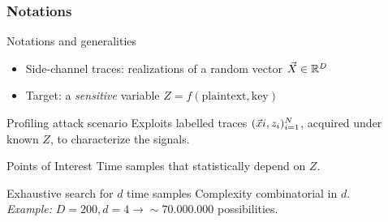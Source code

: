 \begin{frame}
\frametitle{Notations}
\begin{block}{Notations and generalities}
\begin{itemize}
\item Side-channel traces: realizations of a random vector $\vec{X} \in \mathbb{R}^D$  
\item Target: a \emph{sensitive} variable $Z = f(\mathrm{plaintext,key})$ 
\end{itemize}
\end{block}
\vspace{-5pt}
\begin{block}{Profiling attack scenario}
Exploits labelled traces $(\vec{x}{i}, z_i)_{i=1}^N$, acquired under known $Z$, to characterize the signals.\\
\end{block}
\pause
\begin{block}{Points of Interest}
Time samples that statistically depend on $Z$.
\end{block}
\pause
\begin{block}{Exhaustive search for $d$ time samples}
Complexity combinatorial in $d$.\\
\emph{Example:} $D=200, d=4 \longrightarrow \sim 70.000.000$ possibilities. 
\end{block}
\end{frame}



